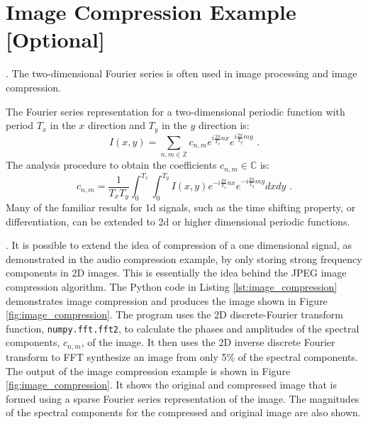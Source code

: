 \newpage
\section{Image Compression Example [Optional]}
. The two-dimensional 
  Fourier series is often used in image processing and image
compression.

The Fourier series representation for a two-dimensional periodic
function with period $T_x$ in the $x$ direction and $T_y$ in the $y$
direction is:
\begin{equation}
I(x,y) = \sum_{n,m \in \mathbb{Z}} c_{n,m} e^{i \frac{2\pi}{T_x}nx} e^{i \frac{2\pi}{T_y}my} \,\,.
\end{equation}
The analysis procedure to obtain the coefficients $c_{n,m}\in \mathbb{C}$ is:
\begin{equation}
c_{n,m} = \frac{1}{T_x T_y}\int_{0}^{T_x}\int_0^{T_y} I(x,y) e^{-i \frac{2\pi}{T_x}nx} e^{-i \frac{2\pi}{T_y}my}dx dy \,\,.
\label{eq:2d_analysis}
\end{equation}
Many of the familiar results for 1d signals, such as the time shifting
property, or differentiation, can be extended to 2d or higher
dimensional periodic functions. 


.  It is possible to
extend the idea of compression of a one dimensional signal, as
demonstrated in the audio compression example, by only storing strong
frequency components in 2D images. This is essentially the idea
behind the JPEG image compression algorithm.  The Python code in
Listing \ref{lst:image_compression} demonstrates image compression and
produces the image shown in Figure \ref{fig:image_compression}. The
program uses the 2D discrete-Fourier transform function,
\verb|numpy.fft.fft2|, to calculate the phases and amplitudes of the
spectral components, $c_{n,m}$, of the image. It then uses the 2D
inverse discrete Fourier transform to FFT synthesize an image from
only 5\% of the spectral components. The output of the image
compression example is shown in Figure \ref{fig:image_compression}. It
shows the original and compressed image that is formed using a sparse
Fourier series representation of the image. The magnitudes of the
spectral components for the compressed and original image are also
shown.

